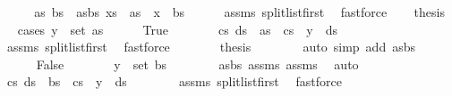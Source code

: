 \begin{isabellebody}
\ {\isacharminus}\isanewline
\ \ \isamarkupfalse%
\ as\ bs\ \ as{\isacharunderscore}bs{\isacharcolon}\ {\isachardoublequoteopen}xs\ {\isacharequal}\ as\ {\isacharat}\ {\isacharbrackleft}x{\isacharbrackright}\ {\isacharat}\ bs{\isachardoublequoteclose}\isanewline
\ \ \ \ \isamarkupfalse%
\ assms{\isacharparenleft}{}{\isacharparenright}\ split{\isacharunderscore}list{\isacharunderscore}first\ \isamarkupfalse%
\ fastforce\isanewline
\ \ \isamarkupfalse%
\ {\isacharquery}thesis\isanewline
\ \ \isamarkupfalse%
{\isacharparenleft}cases\ {\isachardoublequoteopen}y\ {\isasymin}\ set\ as{\isachardoublequoteclose}{\isacharparenright}\isanewline
\ \ \ \ \isamarkupfalse%
\ True\isanewline
\ \ \ \ \isamarkupfalse%
\ \isamarkupfalse%
\ cs\ ds\ \ {\isachardoublequoteopen}as\ {\isacharequal}\ cs\ {\isacharat}\ {\isacharbrackleft}y{\isacharbrackright}\ {\isacharat}\ ds{\isachardoublequoteclose}\isanewline
\ \ \ \ \ \ \isamarkupfalse%
\ assms{\isacharparenleft}{}{\isacharparenright}\ split{\isacharunderscore}list{\isacharunderscore}first\ \isamarkupfalse%
\ fastforce\isanewline
\ \ \ \ \isamarkupfalse%
\ \isamarkupfalse%
\ {\isacharquery}thesis\isanewline
\ \ \ \ \ \ \isamarkupfalse%
\ {\isacharparenleft}auto\ simp\ add{\isacharcolon}\ as{\isacharunderscore}bs{\isacharparenright}\isanewline
\ \ \isamarkupfalse%
\isanewline
\ \ \ \ \isamarkupfalse%
\ False\isanewline
\ \ \ \ \isamarkupfalse%
\ \isamarkupfalse%
\ {\isachardoublequoteopen}y\ {\isasymin}\ set\ bs{\isachardoublequoteclose}\isanewline
\ \ \ \ \ \ \isamarkupfalse%
\ as{\isacharunderscore}bs\ assms{\isacharparenleft}{}{\isacharparenright}\ assms{\isacharparenleft}{}{\isacharparenright}\ \isamarkupfalse%
\ auto\isanewline
\ \ \ \ \isamarkupfalse%
\ \isamarkupfalse%
\ cs\ ds\ \ {\isachardoublequoteopen}bs\ {\isacharequal}\ cs\ {\isacharat}\ {\isacharbrackleft}y{\isacharbrackright}\ {\isacharat}\ ds{\isachardoublequoteclose}\isanewline
\ \ \ \ \ \ \isamarkupfalse%
\ assms{\isacharparenleft}{}{\isacharparenright}\ split{\isacharunderscore}list{\isacharunderscore}first\ \isamarkupfalse%
\ fastforce\isanewline
\ \ \ \ \isamarkupfalse%

\end{isabellebody}
